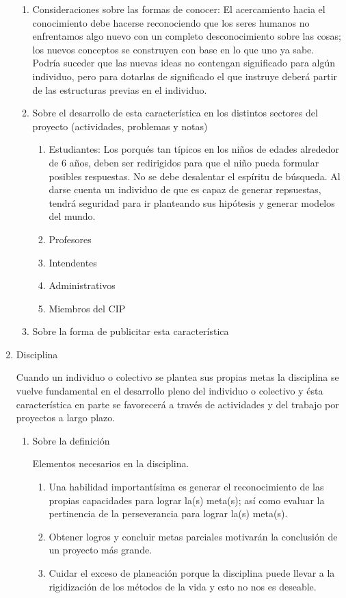 \documentclass[10pt,letterpaper]{report}
\begin{document}
\begin{enumerate}
		\begin{enumerate}[label*=\arabic*.]
		\item Consideraciones sobre las formas de conocer:
		El acercamiento hacia el conocimiento debe hacerse reconociendo que los seres humanos no enfrentamos algo nuevo con un completo desconocimiento sobre las cosas; los nuevos conceptos se construyen con base en lo que uno ya sabe. Podría suceder que las nuevas ideas no contengan significado para algún individuo, pero para dotarlas de significado el que instruye deberá partir de las estructuras previas en el individuo.
		
		\item Sobre el desarrollo de esta característica en los distintos sectores del proyecto (actividades, problemas y notas)
			\begin{enumerate}[label*=\arabic*.]
			\item Estudiantes: Los porqués tan típicos en los niños de edades alrededor de 6 años, deben ser redirigidos para que el niño pueda formular posibles respuestas. No se debe desalentar el espíritu de búsqueda. Al darse cuenta un individuo de que es capaz de generar repsuestas, tendrá seguridad para ir planteando sus hipótesis y generar modelos del mundo.
			\item Profesores
			\item Intendentes
			\item Administrativos
			\item Miembros del CIP
			\end{enumerate}
		\item Sobre la forma de publicitar esta característica
		\end{enumerate}

	 \item Disciplina
		
	 Cuando un individuo o colectivo se plantea sus propias metas la disciplina se vuelve fundamental en el desarrollo pleno del individuo o colectivo y \'esta caracter\'istica en parte se favorecer\'a a trav\'es de actividades y del trabajo por proyectos a largo plazo.

	\begin{enumerate}[label*=\arabic*.]
		\item Sobre la definición

Elementos necesarios en la disciplina.
	\begin{enumerate}[label*=\arabic*.]
	\item Una habilidad importantísima es generar el reconocimiento de las propias capacidades para lograr la(s) meta(s); así como evaluar la pertinencia de la 		perseverancia para lograr la(s) meta(s).
	\item Obtener logros y concluir metas parciales motivar\'an la conclusión de un proyecto más grande.
	\item Cuidar el exceso de planeaci\'on porque la disciplina puede llevar a la rigidizaci\'on de los m\'etodos de la vida y esto no nos es deseable.


\end{enumerate}
\end{enumerate}
\end{enumerate}
\end{document}
